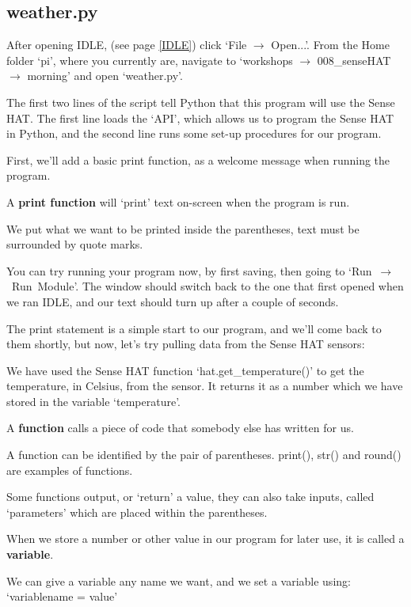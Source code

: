 \documentclass[a4paper, twocolumn, twoside, 12pt]{article}
\newenvironment{aside}
		{
		\begin{mdframed}[
			style=0,%
			leftline=false,
			rightline=false,
			innerbottommargin=2pt,
			innerleftmargin=12pt,
			innerrightmargin=0pt,
			linewidth=0.75pt,
			skipabove=6pt,
			skipbelow=6pt
			]
				\small
				\color{JungleGreen}
				\setlength{\parskip}{2pt}
				\vspace{2pt} %
		}
		{
		\end{mdframed}
		}
\begin{document}
		\subsection*{weather.py}
		
		After opening IDLE, (see page \ref{IDLE}) click `File $\rightarrow$ Open...'.
		From the Home folder `pi', where you currently are, navigate to
		`workshops $\rightarrow$ 008\_senseHAT $\rightarrow$ morning'
		and open `weather.py'.
		
		
		
			The first two lines of the script tell Python that this program will use the Sense HAT.
			The first line loads the `API', which allows us to program the Sense HAT in Python, and
			the second line runs some set-up procedures for our program.
			
			First, we'll add a basic print function, as a welcome message when running the program.
			
			\begin{aside}
				A \textbf{print function} will `print' text on-screen when the program is run.
				
				We put what we want to be printed inside the parentheses, text must be surrounded by quote marks.
			\end{aside}

		
		
			You can try running your program now, by first saving, then going to \mbox{`Run $\rightarrow$ Run Module'}. The window should switch back to the one that first opened when we ran IDLE, and our text should turn up after a couple of seconds.
			
			The print statement is a simple start to our program, and we'll come back to them shortly, but now, let's try pulling data from the Sense HAT sensors:
			
		
		
		We have used the Sense HAT function `hat.get\_temperature()' to get the temperature, in Celsius, from the sensor. It returns it as a number which we have stored in the variable `temperature'.
		
		\begin{aside}
			A \textbf{function} calls a piece of code that somebody else has written for us.
			
			A function can be identified by the pair of parentheses. print(), str() and round() are examples of functions.
			
			Some functions output, or `return' a value, they can also take inputs, called `parameters' which are placed within the parentheses.
		\end{aside}
		\begin{aside}
			When we store a number or other value in our program for later use, it is called a \textbf{variable}.
			
			We can give a variable any name we want, and we set a variable using: `variablename = value'
		\end{aside}
		
\end{document}
